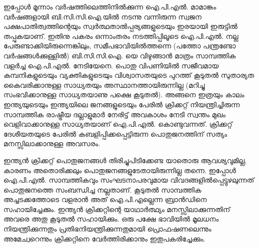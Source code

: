 ഇപ്പോള്‍ മൂന്നാം വര്‍ഷത്തിലെത്തിനില്‍ക്കുന്ന ഐ.പി.എല്‍. മാമാങ്കം വര്‍ഷങ്ങളായി ബി.സി.സി.ഐ.യില്‍ നടന്നു വന്നിരുന്ന സ്വജന പക്ഷപാതിത്വത്തിന്റെയും സ്വര്‍ത്ഥതാല്‍പ്പര്യങ്ങളുടെയും ഇരയായി ഇരുട്ടില്‍ തപ്പുകയാണ്. ഇതിനു പകരം ഒന്നാംതരം നടത്തിപ്പിലൂടെ ഐ.പി.എല്‍. നല്ല പേരുണ്ടാക്കിയിരുന്നെങ്കിലും, സമീപഭാവിയില്‍ത്തന്നെ (പത്തോ പന്ത്രണ്ടോ വര്‍ഷങ്ങള്‍ക്കുള്ളില്‍) ബി.സി.സി.ഐ. യെ വിഴുങ്ങാന്‍ മാത്രം സാമ്പത്തിക വളര്‍ച്ച ഐ.പി.എല്‍. നേടിയേനെ. പൊതു വിപണിയില്‍ സജീവമായ കമ്പനികളുടെയും വ്യക്തികളുടെയും വിശ്വാസതയുടെ പുറത്ത് കൂടുതല്‍ സുതാര്യത കൈവരിക്കാനുള്ള സാധ്യതയും അസ്ഥാനത്തായിരുന്നില്ല (മറിച്ചു സംഭവിക്കാനുള്ള സാധ്യതയാണു പക്ഷെ കൂടുതല്‍). അങ്ങനെ ഇത്രയും കാലം ഇന്ത്യയുടെയും ഇന്ത്യയിലെ ജനങ്ങളുടെയും പേരില്‍ ക്രിക്കറ്റ് നിയന്ത്രിച്ചിരുന്ന സാമ്പത്തിക രാഷ്ട്രീയ ദല്ലാളുമാര്‍ നേരിട്ട് അവകാശം നേടി സ്വന്തം മുഖം വെളിവാക്കാനുള്ള സാധ്യതയാണ് ഐ.പി.എല്‍. കൊണ്ടുവന്നത്. ക്രിക്കറ്റ് ദേശീയതയുടെ പേരില്‍ കബളിപ്പിക്കപ്പെട്ടിരുന്ന പൊതുജനത്തിന് സത്യം മനസ്സിലാക്കാനുള്ള അവസരം.

ഇന്ത്യന്‍ ക്രിക്കറ്റ് പൊതുജനങ്ങള്‍ തിരിച്ചുപിടിക്കേണ്ട യാതൊരു ആവശ്യവുമില്ല, കാരണം അതൊരിക്കലും പൊതുജനങ്ങളുടേതായിരുന്നില്ല തന്നെ. ഇപ്പോള്‍ ഐ.പി.എല്‍. സാമ്പത്തികവും സംഘടനാപരവുമായ വിവദങ്ങളില്‍പ്പെട്ടുഴലുന്നത് പൊതുജനത്തെ സംബന്ധിച്ച നല്ലതാണ്. കൂടുതല്‍ സാമ്പത്തിക അച്ചടക്കത്തോടെ വളരാന്‍ അത് ഐ.പി.എല്ലെന്ന ബ്രാന്‍ഡിനെ സഹായിച്ചേക്കും. ഇന്ത്യന്‍ ക്രിക്കറ്റിന്റെ യാഥാര്‍ത്ഥ്യം മനസ്സിലാക്കുന്നതിന് അവരെ അതു കൂടുതല്‍ സഹായിക്കും. ഒരു പക്ഷേ ഭാവിയില്‍ മൂലധനം നിയന്ത്രിക്കുന്നതും പ്രതിഭനിയന്ത്രിക്കുന്നതുമായി പ്രൊഫഷണലെന്നും അമേച്വറെന്നും ക്രിക്കറ്റിനെ വേര്‍ത്തിരിക്കാനും ഇതുപകരിച്ചേക്കും.
\newpage
